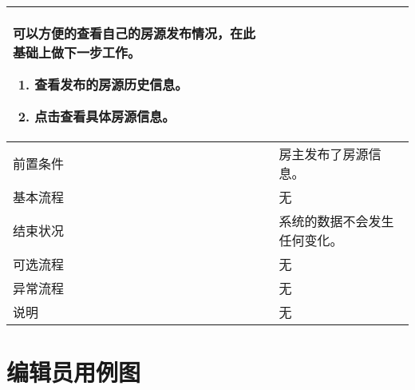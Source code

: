 \begin{table}[htbp]
\begin{tabular}{|l|l|l|l|}
{\begin{minipage}[t]{0.8\textwidth}
                可以方便的查看自己的房源发布情况，在此基础上做下一步工作。
                \begin{enumerate}
                    \item 查看发布的房源历史信息。
                    \item 点击查看具体房源信息。
                \end{enumerate}
                \vspace{.5em}
            \end{minipage}}                                                                                                                                                                                  \\
        \hline
        前置条件                          & \multicolumn{3}{l|}{  房主发布了房源信息。}                                                                                                                              \\
        \hline
        基本流程                          & \multicolumn{3}{l|}{无}                                                                                                                                                  \\
        \hline
        结束状况                          & \multicolumn{3}{l|}{系统的数据不会发生任何变化。   }                                                                                                                     \\
        \hline
        可选流程                          & \multicolumn{3}{l|}{无}                                                                                                                                                  \\
        \hline
        异常流程                          & \multicolumn{3}{l|}{无}                                                                                                                                                  \\
        \hline
        说明                              & \multicolumn{3}{l|}{ 无}                                                                                                                                                 \\
        \hline
    \end{tabular}
\end{table}
\section{编辑员用例图}


